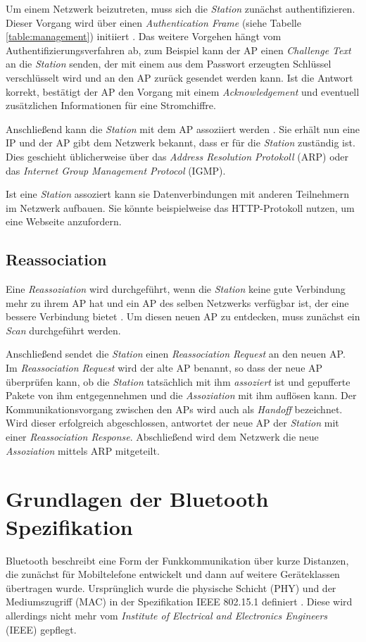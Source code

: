 Um einem Netzwerk beizutreten, muss sich die \emph{Station} zunächst authentifizieren.
Dieser Vorgang wird über einen \emph{Authentication Frame} (siehe Tabelle \ref{table:management}) initiiert \cite{ieee2012auth}.
Das weitere Vorgehen hängt vom Authentifizierungsverfahren ab, zum Beispiel kann der AP einen \emph{Challenge Text} an die \emph{Station} senden, der mit einem aus dem Passwort erzeugten Schlüssel verschlüsselt wird und an den AP zurück gesendet werden kann.
Ist die Antwort korrekt, bestätigt der AP den Vorgang mit einem \emph{Acknowledgement} und eventuell zusätzlichen Informationen für eine Stromchiffre.

Anschließend kann die \emph{Station} mit dem AP assoziiert werden \cite{ieee2012associate}.
Sie erhält nun eine IP und der AP gibt dem Netzwerk bekannt, dass er für die \emph{Station} zuständig ist.
Dies geschieht üblicherweise über das \emph{Address Resolution Protokoll} (ARP) oder das \emph{Internet Group Management Protocol} (IGMP).

Ist eine \emph{Station} assoziert kann sie Datenverbindungen mit anderen Teilnehmern im Netzwerk aufbauen.
Sie könnte beispielweise das HTTP-Protokoll nutzen, um eine Webseite anzufordern.

\subsection{Reassociation}
Eine \emph{Reassoziation} wird durchgeführt, wenn die \emph{Station} keine gute Verbindung mehr zu ihrem AP hat und ein AP des selben Netzwerks verfügbar ist, der eine bessere Verbindung bietet \cite{ieee2012reassociate}.
Um diesen neuen AP zu entdecken, muss zunächst ein \emph{Scan} durchgeführt werden.

Anschließend sendet die \emph{Station} einen \emph{Reassociation Request} an den neuen AP.
Im \emph{Reassociation Request} wird der alte AP benannt, so dass der neue AP überprüfen kann, ob die \emph{Station} tatsächlich mit ihm \emph{assoziert} ist und gepufferte Pakete von ihm entgegennehmen und die \emph{Assoziation} mit ihm auflösen kann.
Der Kommunikationsvorgang zwischen den APs wird auch als \emph{Handoff} bezeichnet.
Wird dieser erfolgreich abgeschlossen, antwortet der neue AP der \emph{Station} mit einer \emph{Reassociation Response}.
Abschließend wird dem Netzwerk die neue \emph{Assoziation} mittels ARP mitgeteilt.


\section{Grundlagen der Bluetooth Spezifikation}
Bluetooth beschreibt eine Form der Funkkommunikation über kurze Distanzen, die zunächst für Mobiltelefone entwickelt und dann auf weitere Geräteklassen übertragen wurde.
Ursprünglich wurde die physische Schicht (PHY) und der Mediumszugriff (MAC) in der Spezifikation IEEE 802.15.1 definiert \cite{ieee2002blue}.
Diese wird allerdings nicht mehr vom \emph{Institute of Electrical and Electronics Engineers} (IEEE) gepflegt.

